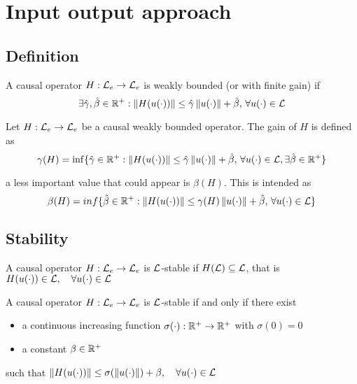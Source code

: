 \usepackage{amsmath}\chapter{Input output approach}

\section{Definition}

\begin{definition}
	A causal operator $H : \mathcal{L}_e \to \mathcal{L}_e$ is weakly bounded (or with finite gain) if
	\[
		\exists \hat\gamma, \hat\beta \in \mathbb{R}^+ : \left\lVert H(u(\cdot))\right\rVert \leq \hat\gamma \left\lVert u(\cdot)\right\rVert + \hat\beta, \, \forall u(\cdot) \in \mathcal{L}
	\]
\end{definition}

\begin{definition}
	Let $H : \mathcal{L}_e \to \mathcal{L}_e$ be a causal weakly bounded operator.
	The gain of $H$ is defined as
	\[
		\gamma(H) = \inf\{\hat\gamma \in \mathbb{R}^+ : \left\lVert H(u(\cdot))\right\rVert \leq \hat\gamma \left\lVert u(\cdot)\right\rVert + \hat\beta, \, \forall u(\cdot) \in \mathcal{L}, \exists \hat\beta \in \mathbb{R}^+\}
	\]
\end{definition}

\begin{nb}a less important value that could appear is $\beta(H)$.
This is intended as
\[
	\beta(H) = inf\{\hat\beta \in \mathbb{R}^+ : \left\lVert H(u(\cdot))\right\rVert \leq \gamma(H) \left\lVert u(\cdot)\right\rVert + \hat\beta, \, \forall u(\cdot) \in \mathcal{L}\}
\]
\end{nb}

\section{Stability}

\begin{definition}
	A causal operator $H : \mathcal{L}_e \to \mathcal{L}_e$ is $\mathcal{L}$-stable if $H(\mathcal{L}) \subseteq \mathcal{L}$, that is $H(u(\cdot)) \in \mathcal{L}, \quad \forall u(\cdot) \in \mathcal{L}$
\end{definition}

\begin{theorem}
	A causal operator $H : \mathcal{L}_e \to \mathcal{L}_e$ is $\mathcal{L}$-stable if and only if there exist
	\begin{itemize}
		\item a continuous increasing function $\sigma(\cdot): \mathbb{R}^+ \to \mathbb{R}^+$ with $\sigma(0) = 0$
		\item a constant $\beta \in \mathbb{R}^+$
	\end{itemize}
	such that $\left\lVert H(u(\cdot))\right\rVert \leq \sigma(\left\lVert u(\cdot)\right\rVert) + \beta, \quad \forall u(\cdot) \in \mathcal{L}$
\end{theorem}

